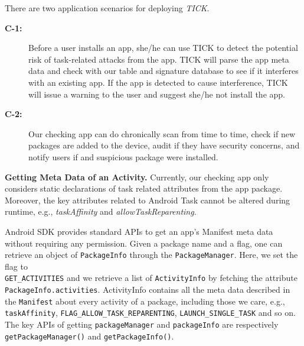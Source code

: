 \documentclass[letterpaper,12pt]{article}
\begin{document}
There are two application scenarios for deploying \textsl{TICK}.
\begin{description}

\item[\textbf{C-1:}] Before a user installs an app, she/he can use
  TICK to detect the potential risk of task-related attacks from the app.  TICK
  will parse the app meta data and check with our table and signature
  database to see if it interferes with an existing app. If the app is
  detected to cause interference, TICK will issue a
  warning to the user and suggest she/he not install the app.
\item[\textbf{C-2:}] Our checking app can do chronically scan from
  time to time, check if new packages are added to the device, audit
  if they have security concerns, and notify users if and suspicious
  package were installed.
\end{description}

\textbf{Getting Meta Data of an Activity.}  Currently, our checking app
only considers static declarations of task related attributes from the
app package. Moreover, the key attributes related to Android Task
cannot be altered during runtime, e.g., \textit{taskAffinity} and
\textit{allowTaskReparenting}.

Android SDK provides standard APIs to get an app's Manifest meta data
without requiring any permission. Given a package name and a flag, one
can retrieve an object of \texttt{PackageInfo} through the
\texttt{PackageManager}. Here, we set the flag to\\
\texttt{GET\_ACTIVITIES} and we retrieve a list of
\texttt{ActivityInfo} by fetching the attribute\\
\texttt{PackageInfo.activities}. ActivityInfo contains all the meta
data described in the \texttt{Manifest} about every activity of a
package, including those we care, e.g.,\\ \texttt{taskAffinity},
\texttt{FLAG\_ALLOW\_TASK\_REPARENTING}, \texttt{LAUNCH\_SINGLE\_TASK}
and so on. The key APIs of getting \texttt{packageManager} and
\texttt{packageInfo} are respectively\\ \texttt{getPackageManager()} and
\texttt{getPackageInfo()}.
\end{document}
